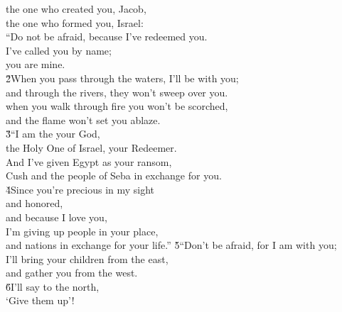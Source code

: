 \begin{poetry}
\poemll    the one who created you, Jacob, \\
\poemlll       the one who formed you, Israel: \\
\poeml ``Do not be afraid, because I've redeemed you. \\
\poemll    I've called you by name; \\
\poemlll       you are mine. \\
\poeml \v{2}When you pass through the waters, I'll be with you; \\
\poemll    and through the rivers, they won't sweep over you. \\
\poeml when you walk through fire you won't be scorched, \\
\poemll    and the flame won't set you ablaze. \\
\poeml \v{3}``I am the  your God, \\
\poemll    the Holy One of Israel, your Redeemer. \\
\poeml And I've given Egypt as your ransom, \\
\poemll    Cush and the people of Seba in exchange for you. \\
\poeml \v{4}Since you're precious in my sight \\
\poemll    and honored, \\
\poeml and because I love you, \\
\poemll    I'm giving up people in your place, \\
\poemll    and nations in exchange for your life.''
\poeml \v{5}``Don't be afraid, for I am with you; \\
\poemll    I'll bring your children from the east, \\
\poemlll       and gather you from the west. \\
\poeml \v{6}I'll say to the north, \\
\poemll    `Give them up'! \\

\end{poetry}
